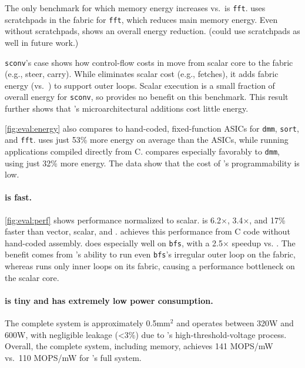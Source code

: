 The only benchmark for which memory energy increases vs.\ \snafu is {\tt fft}.
% 
\snafu uses scratchpads in the fabric for {\tt fft}, which reduces main memory energy.
% 
Even without scratchpads, \riptide shows an overall energy reduction.
(\riptide could use scratchpads as well in future work.)

{\tt sconv}'s case shows how control-flow costs in \riptide move from scalar core to the
fabric (e.g., steer, carry).
% 
While \riptide eliminates scalar cost (e.g., fetches), it adds fabric energy (vs.\
\snafu) to support outer loops.
% 
Scalar execution is a small fraction of overall energy for {\tt sconv},
so \riptide provides no benefit on this benchmark.
%
This result further shows that \riptide's microarchitectural additions cost little energy.


\autoref{fig:eval:energy} also compares \riptide to hand-coded, fixed-function
ASICs for {\tt dmm}, {\tt sort}, and {\tt fft}.
% 
\riptide uses just 53\% more energy on average than the ASICs, while running
applications compiled directly from C. %
% 
\riptide compares especially favorably to {\tt dmm}, using just 32\% more energy.
% 
The data show that the cost of \riptide's programmability is low.

\paragraph{\riptide is fast.}
\autoref{fig:eval:perf} shows performance normalized to scalar.
%
\riptide is 6.2$\times$, 3.4$\times$, and 17\% faster than vector, scalar, and \snafu.
%
\riptide achieves this performance from C code without hand-coded assembly.
% 
\riptide does especially well on {\tt bfs}, with a 2.5$\times$ speedup vs. \snafu. The benefit comes
from \riptide's ability to run even {\tt bfs}'s irregular outer loop on the fabric, whereas
% 
\snafu runs only inner loops on its fabric, causing a performance
bottleneck on the scalar core. %

\paragraph{\riptide is tiny and has extremely low power consumption.}
%
The complete \riptide system is approximately 0.5mm$^2$ and operates between
320\textmu W and 600\textmu W, with negligible leakage (<3\%) due to \riptide's high-threshold-voltage process.
% 
Overall, the complete system, including memory, achieves 141 MOPS/mW vs.\ 110 
MOPS/mW for \snafu's full system.

